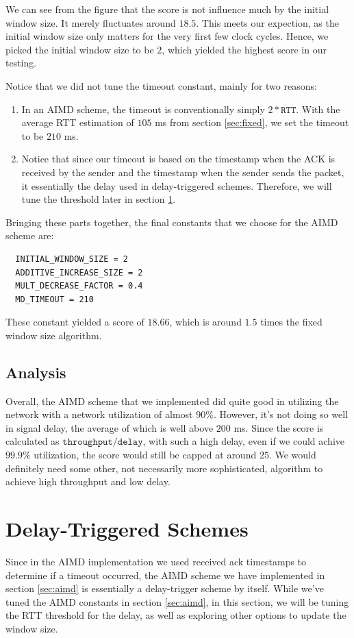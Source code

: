 \documentclass[11pt,a4paper]{article}
\begin{document}
  We can see from the figure that the score is not influence much by the initial
  window size. It merely fluctuates around $18.5$. This meets our expection, as
  the initial window size only matters for the very first few clock cycles.
  Hence, we picked the initial window size to be $2$, which yielded the highest
  score in our testing.

  Notice that we did not tune the timeout constant, mainly for two reasons:
  \begin{enumerate}
    \item In an AIMD scheme, the timeout is conventionally simply $2 *
      \texttt{RTT}$.
      With the average RTT estimation of $105$ ms from section \ref{sec:fixed},
      we set the timeout to be $210$ ms.
    \item Notice that since our timeout is based on the timestamp when the ACK
      is received by the sender and the timestamp when the sender sends the
      packet, it essentially the delay used in delay-triggered schemes.
      Therefore, we will tune the threshold later in section \ref{sec:delay}.
  \end{enumerate}

  Bringing these parts together, the final constants that we choose for the AIMD
  scheme are:
  \pagebreak
  \begin{verbatim}
  INITIAL_WINDOW_SIZE = 2
  ADDITIVE_INCREASE_SIZE = 2
  MULT_DECREASE_FACTOR = 0.4
  MD_TIMEOUT = 210
  \end{verbatim}

  These constant yielded a score of $18.66$, which is around $1.5$ times the
  fixed window size algorithm.

\subsection{Analysis}

Overall, the AIMD scheme that we implemented did quite good in utilizing the
network with a network utilization of almost $90\%$. However, it's not doing so
well in signal delay, the average of which is well above $200$ ms. Since the
score is calculated as $\texttt{throughput}/\texttt{delay}$, with such a high delay, even if we
could achive $99.9\%$ utilization, the score would still be capped at around
$25$. We would
definitely need some other, not necessarily more sophisticated, algorithm to
achieve high throughput and low delay.

\section{Delay-Triggered Schemes}
\label{sec:delay}
Since in the AIMD implementation we used received ack timestamps to determine if
a timeout
occurred, the AIMD scheme we have implemented in section \ref{sec:aimd} is
essentially a delay-trigger scheme by itself. While we've tuned the AIMD
constants in section \ref{sec:aimd}, in this section, we will be tuning the
RTT threshold for the delay, as well as exploring other options to update the window
size. 
\end{document}
